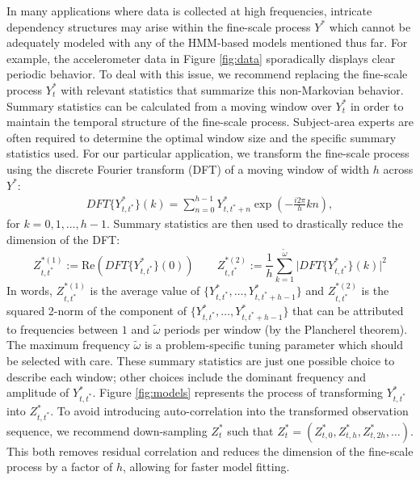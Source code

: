 In many applications where data is collected at high frequencies, intricate dependency structures may arise within the fine-scale process $Y^*$ which cannot be adequately modeled with any of the HMM-based models mentioned thus far. For example, the accelerometer data in Figure \ref{fig:data} sporadically displays clear periodic behavior. To deal with this issue, we recommend replacing the fine-scale process $Y_t^*$ with relevant statistics that summarize this non-Markovian behavior. Summary statistics can be calculated from a moving window over $Y_t^*$ in order to maintain the temporal structure of the fine-scale process. Subject-area experts are often required to determine the optimal window size and the specific summary statistics used. 
%
%
For our particular application, we transform the fine-scale process using the discrete Fourier transform (DFT) of a moving window of width $h$ across $Y^*$:
%
\begin{align*}
    DFT\{Y^*_{t,t^*}\}(k) = \sum_{n=0}^{h-1} Y^*_{t,t^*+n}\exp\left(-\frac{i 2\pi}{h} kn \right),
\end{align*}
%
for $k = 0, 1, \ldots, h-1$. Summary statistics are then used to drastically reduce the dimension of the DFT:
%
\begin{equation}
    \label{eqn:z}
    Z_{t,t^*}^{*(1)} := \text{Re}\left(DFT\{Y^*_{t,t^*}\}(0)\right) \qquad Z_{t,t^*}^{*(2)} := \frac{1}{h}\sum_{k=1}^{\tilde{\omega}}\bigg|DFT\{Y^*_{t,t^*}\}(k)\bigg|^2
\end{equation}
%
In words, $Z_{t,t^*}^{*(1)}$ is the average value of $\{Y^*_{t,t^*}, \ldots, Y^*_{t,t^*+h-1}\}$ and $Z_{t,t^*}^{*(2)}$ is the squared 2-norm of the component of $\{Y^*_{t,t^*}, \ldots, Y^*_{t,t^*+h-1}\}$ that can be attributed to frequencies between $1$ and $\tilde{\omega}$ periods per window (by the Plancherel theorem). The maximum frequency $\tilde{\omega}$ is a problem-specific tuning parameter which should be selected with care. These summary statistics are just one possible choice to describe each window; other choices include the dominant frequency and amplitude of $Y^*_{t,t^*}$. Figure \ref{fig:models} represents the process of transforming $Y^*_{t,t^*}$ into $Z^*_{t,t^*}$. To avoid introducing auto-correlation into the transformed observation sequence, we recommend down-sampling $Z^*_t$ such that $Z^*_t = \left(Z^*_{t,0},Z^*_{t,h},Z^*_{t,2h},\ldots\right)$. This both removes residual correlation and reduces the dimension of the fine-scale process by a factor of $h$, allowing for faster model fitting.

